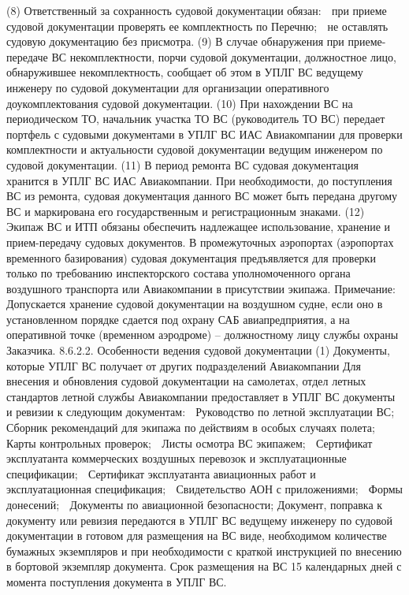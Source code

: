 (8) Ответственный за сохранность судовой документации обязан:
	при приеме судовой документации проверять ее комплектность по Перечню;
	не оставлять судовую документацию без присмотра.
(9) В случае обнаружения при приеме-передаче ВС некомплектности, порчи судовой документации, должностное лицо, обнаружившее некомплектность, сообщает об этом в УПЛГ ВС ведущему инженеру по судовой документации для организации оперативного доукомплектования судовой документации. 
(10) При нахождении ВС на периодическом ТО, начальник участка ТО ВС (руководитель ТО ВС) передает портфель с судовыми документами в УПЛГ ВС ИАС Авиакомпании для проверки комплектности и актуальности судовой документации ведущим инженером по судовой документации.
(11) В период ремонта ВС судовая документация хранится в УПЛГ ВС ИАС Авиакомпании. При необходимости, до поступления ВС из ремонта, судовая документация данного ВС может быть передана другому ВС и маркирована его государственным и регистрационным знаками.  
 (12)	Экипаж ВС и ИТП обязаны обеспечить надлежащее использование, хранение и прием-передачу судовых документов. 
В промежуточных аэропортах (аэропортах временного базирования) судовая документация предъявляется для проверки только по требованию инспекторского состава уполномоченного органа воздушного транспорта или Авиакомпании в присутствии экипажа. 
Примечание: Допускается хранение судовой документации на воздушном судне, если оно в установленном порядке сдается под охрану САБ авиапредприятия, а на оперативной точке (временном аэродроме) – должностному лицу службы охраны Заказчика.
8.6.2.2. Особенности ведения судовой документации
(1) Документы, которые УПЛГ ВС получает от других подразделений Авиакомпании
Для внесения и обновления судовой документации на самолетах, отдел летных стандартов летной службы Авиакомпании предоставляет в УПЛГ ВС документы и ревизии к следующим документам:
	Руководство по летной эксплуатации ВС;
	Сборник рекомендаций для экипажа по действиям в особых случаях полета;
	Карты контрольных проверок; 
	Листы осмотра ВС экипажем;
	Сертификат эксплуатанта коммерческих воздушных перевозок и эксплуатационные спецификации;
	Сертификат эксплуатанта авиационных работ и эксплуатационная спецификация;
	Свидетельство АОН с приложениями;
	Формы донесений;
	Документы по авиационной безопасности;
Документ, поправка к документу или ревизия передаются в УПЛГ ВС ведущему инженеру по судовой документации в готовом для размещения на ВС виде, необходимом количестве бумажных экземпляров и при необходимости с краткой инструкцией по внесению в бортовой экземпляр документа. Срок размещения на ВС 15 календарных дней с момента поступления документа в УПЛГ ВС.
